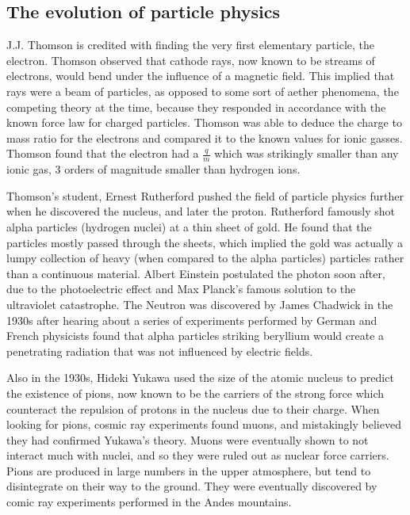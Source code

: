   \subsection{The evolution of particle physics} \label{sec:history}
   J.J. Thomson is credited with finding the very first elementary particle, \cite{thomson_electron} the electron. Thomson observed that cathode rays, now known to be streams of electrons, would bend under the influence of a magnetic field. This implied that rays were a beam of particles, as opposed to some sort of aether phenomena, the competing theory at the time, because they responded in accordance with the known force law for charged particles. Thomson was able to deduce the charge to mass ratio for the electrons and compared it to the known values for ionic gasses. Thomson found that the electron had a $\frac{q}{m}$ which was strikingly smaller than any ionic gas, 3 orders of magnitude smaller than hydrogen ions.

   Thomson's student, Ernest Rutherford pushed the field of particle physics further when he discovered the nucleus, and later the proton. Rutherford famously shot alpha particles (hydrogen nuclei) at a thin sheet of gold. He found that the particles mostly passed through the sheets, which implied the gold was actually a lumpy collection of heavy (when compared to the alpha particles) particles rather than a continuous material. Albert Einstein postulated the photon soon after, due to the photoelectric effect and Max Planck's famous solution to the ultraviolet catastrophe. The Neutron was discovered by James Chadwick in the 1930s after hearing about a series of experiments performed by German and French physicists found that alpha particles striking beryllium would create a penetrating radiation that was not influenced by electric fields. 

   Also in the 1930s, Hideki Yukawa used the size of the atomic nucleus to predict the existence of pions, now known to be the carriers of the strong force which counteract the repulsion of protons in the nucleus due to their charge. When looking for pions, cosmic ray experiments found muons, and mistakingly believed they had confirmed Yukawa's theory. Muons were eventually shown to not interact much with nuclei, and so they were ruled out as nuclear force carriers. Pions are produced in large numbers in the upper atmosphere, but tend to disintegrate on their way to the ground. They were eventually discovered by comic ray experiments performed in the Andes mountains.

